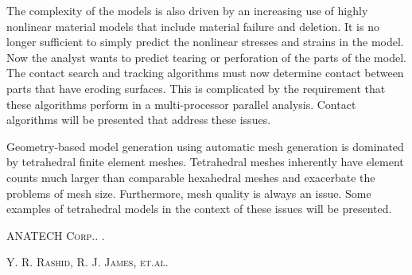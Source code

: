 The complexity of the models is also driven by an increasing use of highly nonlinear material models that include material failure and deletion. It is no longer sufficient to simply predict the nonlinear stresses and strains in the model. Now the analyst wants to predict tearing or perforation of the parts of the model. The contact search and tracking algorithms must now determine contact between parts that have eroding surfaces. This is complicated by the requirement that these algorithms perform in a multi-processor parallel analysis. Contact algorithms will be presented that address these issues.

Geometry-based model generation using automatic mesh generation is dominated by tetrahedral finite element meshes. Tetrahedral meshes inherently have element counts much larger than comparable hexahedral meshes and exacerbate the problems of mesh size. Furthermore, mesh quality is always an issue. Some examples of tetrahedral models in the context of these issues will be presented.


\begin{thebibliography}{1}
\textsc{ANATECH Corp.}.
.

\textsc{Y. R. Rashid, R. J. James, et.al.}
\end{thebibliography}